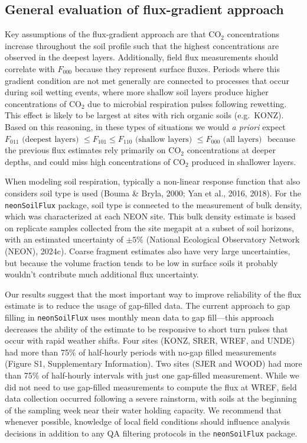 \documentclass[
  letterpaper,
  DIV=11,
  numbers=noendperiod]{scrartcl}
\begin{document}
\subsection{General evaluation of flux-gradient
approach}\label{sec-general-eval}

Key assumptions of the flux-gradient approach are that CO\(_{2}\)
concentrations increase throughout the soil profile such that the
highest concentrations are observed in the deepest layers. Additionally,
field flux measurements should correlate with \(F_{000}\) because they
represent surface fluxes. Periods where this gradient condition are not
met generally are connected to processes that occur during soil wetting
events, where more shallow soil layers produce higher concentrations of
CO\(_{2}\) due to microbial respiration pulses following rewetting. This
effect is likely to be largest at sites with rich organic soils
(e.g.~KONZ). Based on this reasoning, in these types of situations we
would \emph{a priori} expect
\(F_{011} \mbox{ (deepest layers) } \leq F_{101} \leq F_{110} \mbox{ (shallow layers) } \leq F_{000} \mbox{ (all layers) }\)
because the previous flux estimates rely primarily on CO\(_2\)
concentrations at deeper depths, and could miss high concentrations of
CO\(_{2}\) produced in shallower layers.

When modeling soil respiration, typically a non-linear response function
that also considers soil type is used (Bouma \& Bryla, 2000; Yan et al.,
2016, 2018). For the \texttt{neonSoilFlux} package, soil type is
connected to the measurement of bulk density, which was characterized at
each NEON site. This bulk density estimate is based on replicate samples
collected from the site megapit at a subset of soil horizons, with an
estimated uncertainty of \(\pm5\%\) (National Ecological Observatory
Network (NEON), 2024c). Coarse fragment estimates also have very large
uncertainties, but because the volume fraction tends to be low in
surface soils it probably wouldn't contribute much additional flux
uncertainty.

Our results suggest that the most important way to improve reliability
of the flux estimate is to reduce the usage of gap-filled data. The
current approach to gap filling in \texttt{neonSoilFlux} uses monthly
mean data to gap fill---this approach decreases the ability of the
estimate to be responsive to short turn pulses that occur with rapid
weather shifts. Four sites (KONZ, SRER, WREF, and UNDE) had more than
75\% of half-hourly periods with no-gap filled measurements (Figure S1,
Supplementary Information). Two sites (SJER and WOOD) had more than 75\%
of half-hourly intervals with just one gap-filled measurement. While we
did not need to use gap-filled measurements to compute the flux at WREF,
field data collection occurred following a severe rainstorm, with soils
at the beginning of the sampling week near their water holding capacity.
We recommend that whenever possible, knowledge of local field conditions
should influence analysis decisions in addition to any QA filtering
protocols in the \texttt{neonSoilFlux} package.
\end{document}
